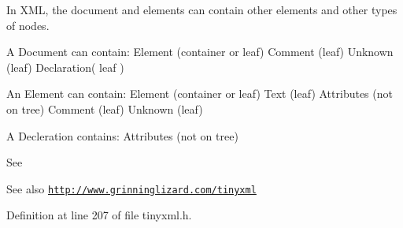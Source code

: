 In XML, the document and elements can contain other elements and other types of nodes.

\begin{DoxyVerb}
    A Document can contain:     Element (container or leaf)
    Comment (leaf)
    Unknown (leaf)
    Declaration( leaf )

    An Element can contain:     Element (container or leaf)
    Text        (leaf)
    Attributes (not on tree)
    Comment (leaf)
    Unknown (leaf)

    A Decleration contains: Attributes (not on tree)
    \end{DoxyVerb}


See \begin{DoxySeeAlso}{See also}
\href{http://www.grinninglizard.com/tinyxml}{\tt http://www.grinninglizard.com/tinyxml} 
\end{DoxySeeAlso}


Definition at line 207 of file tinyxml.h.


